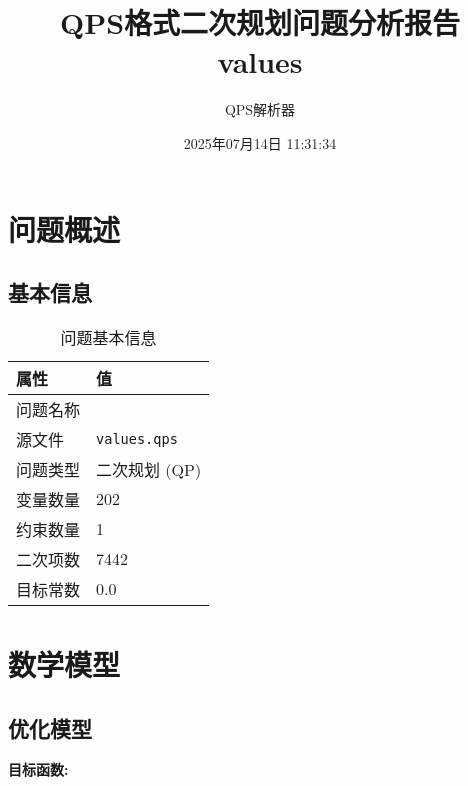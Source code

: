 \documentclass[a4paper,11pt]{article}
\title{QPS格式二次规划问题分析报告\\{\large values}}
\author{QPS解析器}
\date{2025年07月14日 11:31:34}
\begin{document}
\maketitle
\tableofcontents
\newpage

\section{问题概述}
\subsection{基本信息}
\begin{table}[h!]
\centering
\begin{tabular}{ll}
\toprule
\textbf{属性} & \textbf{值} \\
\midrule
问题名称 & \texttt{} \\
源文件 & \texttt{values.qps} \\
问题类型 & 二次规划 (QP) \\
变量数量 & 202 \\
约束数量 & 1 \\
二次项数 & 7442 \\
目标常数 & 0.0 \\
\bottomrule
\end{tabular}
\caption{问题基本信息}
\end{table}

\section{数学模型}
\subsection{优化模型}

\textbf{目标函数:}
\end{document}
